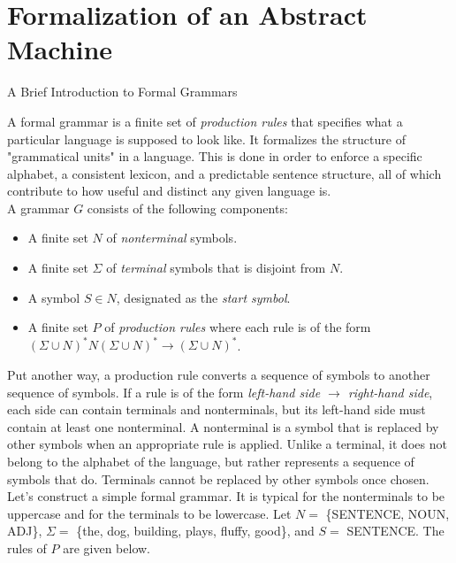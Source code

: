 \section{Formalization of an Abstract Machine}

\begin{bluebox}{A Brief Introduction to Formal Grammars}

    A formal grammar is a finite set of \textit{production rules} that specifies what a particular language is supposed to look like. It formalizes the structure of "grammatical units" in a language. This is done in order to enforce a specific alphabet, a consistent lexicon, and a predictable sentence structure, all of which contribute to how useful and distinct any given language is. \\
        
    A grammar $G$ consists of the following components:
    \begin{itemize}
        \item A finite set $N$ of \textit{nonterminal} symbols.
        \item A finite set $\Sigma$ of \textit{terminal} symbols that is disjoint from $N$.
        \item A symbol $S\in N$, designated as the \textit{start symbol}.
        \item A finite set $P$ of \textit{production rules} where each rule is of the form ${(\Sigma\cup N)^*N(\Sigma\cup N)^*\rightarrow(\Sigma\cup N)^*}$.
    \end{itemize}
        
    Put another way, a production rule converts a sequence of symbols to another sequence of symbols. If a rule is of the form \textit{left-hand side $\rightarrow$ right-hand side}, each side can contain terminals and nonterminals, but its left-hand side must contain at least one nonterminal. A nonterminal is a symbol that is replaced by other symbols when an appropriate rule is applied. Unlike a terminal, it does not belong to the alphabet of the language, but rather represents a sequence of symbols that do. Terminals cannot be replaced by other symbols once chosen. \\
        
    Let's construct a simple formal grammar. It is typical for the nonterminals to be uppercase and for the terminals to be lowercase. Let $N=$ \{SENTENCE, NOUN, ADJ\}, $\Sigma=$ \{the, dog, building, plays, fluffy, good\}, and $S=$ SENTENCE. The rules of $P$ are given below.
        

\end{bluebox}
